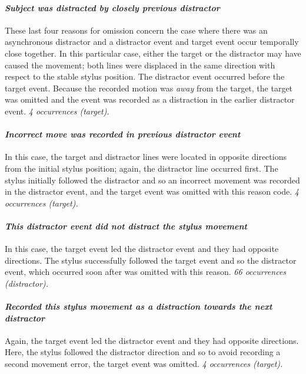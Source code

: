 \documentclass[11pt, a4paper]{article}
\begin{document}
\paragraph{\emph{Subject was distracted by closely previous distractor}}
These last four reasons for omission concern the case where there was
an asynchronous distractor and a distractor event and target event
occur temporally close together. In this particular case, either the
target or the distractor may have caused the movement; both lines were
displaced in the same direction with respect to the stable stylus
position. The distractor event occurred before the target
event. Because the recorded motion was \emph{away} from the target,
the target was omitted and the event was recorded as a distraction in
the earlier distractor event.  \emph{4 occurrences (target).}

\paragraph{\emph{Incorrect move was recorded in previous distractor event}}
In this case, the target and distractor lines were located in opposite
directions from the initial stylus position; again, the distractor
line occurred first. The stylus initially followed the distractor and so
an incorrect movement was recorded in the distractor event, and the
target event was omitted with this reason code. \emph{4 occurrences
  (target).}


\paragraph{\emph{This distractor event did not distract the stylus movement}}
In this case, the target event led the distractor event and they
had opposite directions. The stylus successfully followed the target
event and so the distractor event, which occurred soon after was omitted
with this reason.  \emph{66 occurrences (distractor).}

\paragraph{\emph{Recorded this stylus movement as a distraction towards the next distractor}}
Again, the target event led the distractor event and they had
opposite directions. Here, the stylus followed the distractor direction
and so to avoid recording a second movement error, the target event was
omitted. \emph{4 occurrences (target).}
\end{document}
